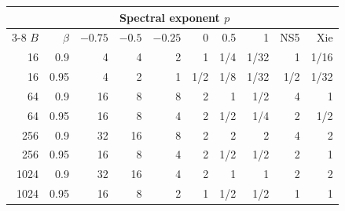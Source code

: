 \begin{tabular}{@{}rrrrrrrrrr@{}}
\toprule
 & & \multicolumn{6}{c}{Spectral exponent $p$} & & \\
\cmidrule(lr){3-8}
$B$ & $\beta$ & $-0.75$ & $-0.5$ & $-0.25$ & 0 & 0.5 & 1 & NS5 & Xie \\
\midrule
16 & 0.9 & 4 & 4 & 2 & 1 & 1/4 & 1/32 & 1 & 1/16 \\
16 & 0.95 & 4 & 2 & 1 & 1/2 & 1/8 & 1/32 & 1/2 & 1/32 \\
64 & 0.9 & 16 & 8 & 8 & 2 & 1 & 1/2 & 4 & 1 \\
64 & 0.95 & 16 & 8 & 4 & 2 & 1/2 & 1/4 & 2 & 1/2 \\
256 & 0.9 & 32 & 16 & 8 & 2 & 2 & 2 & 4 & 2 \\
256 & 0.95 & 16 & 8 & 4 & 2 & 1/2 & 1/2 & 2 & 1 \\
1024 & 0.9 & 32 & 16 & 4 & 2 & 1 & 1 & 2 & 2 \\
1024 & 0.95 & 16 & 8 & 2 & 1 & 1/2 & 1/2 & 1 & 1 \\
\bottomrule
\end{tabular}
